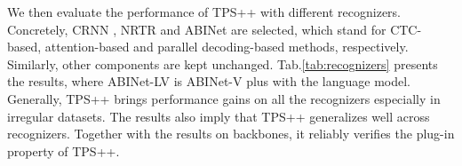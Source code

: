 \documentclass{article}
\begin{document}
\begin{table}[t]
\caption{TPS++ evaluation on different backbones.}
\label{tab:backbone}
\end{table}


We then evaluate the performance of TPS++ with different recognizers. Concretely, CRNN \cite{ShiBY17crnn}, NRTR \cite{sheng2019nrtr} and ABINet \cite{ABInet21CVPR} are selected, which stand for CTC-based, attention-based and parallel decoding-based methods, respectively. Similarly, other components are kept unchanged. Tab.\ref{tab:recognizers} presents the results, where ABINet-LV is ABINet-V plus with the language model. Generally, TPS++ brings performance gains on all the recognizers especially in irregular datasets. The results also imply that TPS++ generalizes well across recognizers. Together with the results on backbones, it reliably verifies the plug-in property of TPS++.  
\end{document}
